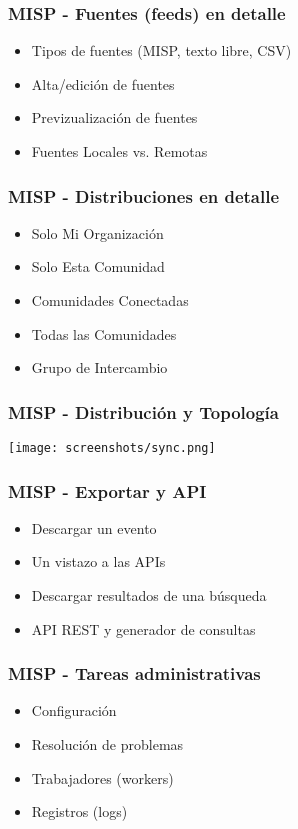 \begin{frame}
    \frametitle{MISP - Fuentes (feeds) en detalle}
    \begin{itemize}
        \item Tipos de fuentes (MISP, texto libre, CSV)
        \item Alta/edición de fuentes
        \item Previzualización de fuentes
        \item Fuentes Locales vs. Remotas
    \end{itemize}
\end{frame}

\begin{frame}
    \frametitle{MISP - Distribuciones en detalle}
    \begin{itemize}
        \item Solo Mi Organización
        \item Solo Esta Comunidad
        \item Comunidades Conectadas
        \item Todas las Comunidades
        \item Grupo de Intercambio
    \end{itemize}
\end{frame}

\begin{frame}
    \frametitle{MISP - Distribución y Topología}
    \texttt{[image: screenshots/sync.png]}
\end{frame}

\begin{frame}
    \frametitle{MISP - Exportar y API}
    \begin{itemize}
        \item Descargar un evento
        \item Un vistazo a las APIs
        \item Descargar resultados de una búsqueda
        \item API REST y generador de consultas
    \end{itemize}
\end{frame}

\begin{frame}
    \frametitle{MISP - Tareas administrativas}
    \begin{itemize}
        \item Configuración
        \item Resolución de problemas
        \item Trabajadores (workers)
        \item Registros (logs)
    \end{itemize}
\end{frame}
